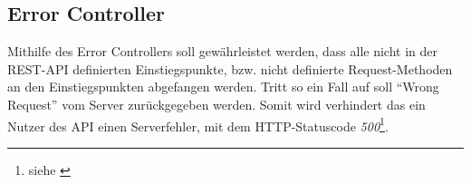 \subsection{Error Controller}\label{sec:errorController}
Mithilfe des Error Controllers soll gewährleistet werden, dass alle nicht in der \gls{REST}-\gls{API} definierten Einstiegspunkte, bzw. nicht definierte Request-Methoden an den Einstiegspunkten abgefangen werden. Tritt so ein Fall auf soll \enquote{Wrong Request} vom Server zurückgegeben werden. Somit wird verhindert das ein Nutzer des \gls{API} einen Serverfehler, mit dem HTTP-Statuscode \textit{500}\footnote{siehe \cite[A.2.5]{kretzschmar}}.
